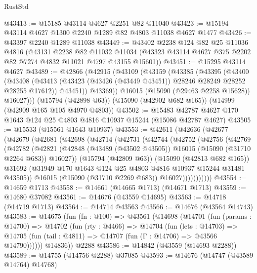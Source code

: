 \begin{lexlean}{RustStd}
\begin{coremodule}
@43413 := @15185 @43114 @4627 @2251 @82 @11040
@43423 := @15194 @43114 @4627 @1300 @2240 @1289 @82 @4803 @11038 @4627 @1477
@43426 := @43397 @2240 @1289 @11038
@43449 := @43402
    @2238
    @124
    @82
    @25
    @11036
    @4816
    (@43131
      @2238
      @82
      @11032
      @11034
      (@43323 @43114 @4627 @375 @2202 @82 @7274 @4832 @11021 @4797 @43155 @15601))
@43451 := @15295 @43114 @4627
@43489 := @42866
    (@42915
      (@43109
        (@43159
          (@43385
            (@43395
              (@43400
                (@43408
                  (@43413 (@43423 (@43426 (@43449 @43451)) @28246 @28249 @28252 @28255 @17612))
                  @43451))
              @43369))
          @16015
          (@15090 (@29463 @2258 @15628))
          @16027)))
    (@15794 (@42898 @63))
    (@15090 (@42902 @682 @165))
    (@14999 (@42909 @165 @105 @4970 @4803))
@43502 := @15483 @42787 @4627 @170 @1643 @124 @25 @4803 @4816 @10937 @15244 (@15086 @42787 @4627)
@43505 := @15533 (@15561 @1643 @10937)
@43553 := @42611
    (@42636
      (@42677
        (@42679
          (@42681
            (@42698
              (@42714
                (@42731
                  (@42744
                    (@42752
                      (@42756
                        (@42769
                          (@42782
                            (@42821
                              (@42848
                                (@43489 (@43502 @43505))
                                @16015
                                (@15090 (@31710 @2264 @683))
                                @16027))
                            (@15794 (@42809 @63))
                            (@15090 (@42813 @682 @165))
                            @31692
                            (@31949 @170 @1643 @124 @25 @4803 @4816 @10937 @15244 @31481 @43505))
                          @16015
                          (@15090 (@31710 @2269 @683))
                          @16027)))))))))))
@43554 := @14659 @1713
@43558 := @14661 (@14665 @1713) (@14671 @1713)
@43559 := @14680 @37082
@43561 := @14676 (@43559 @14695)
@43563 := @14718 (@14719 @1713)
@43564 := @14714 @43563
@43566 := @14676 (@43564 @14743)
@43583 := @14675
    (fun (fn : @100) =>
    @43561
      (@14698
        (@14701
          (fun (params : @14700) =>
          @14702
            (fun (rty : @4466) =>
            @14704
              (fun (lets : @14703) =>
              @14705 (fun (tail : @4811) => @14707 (fun (Γ : @14706) => @43566 @14790))))))
        @14836))
    @2288
@43586 := @14842 (@43559 (@14693 @2288))
@43589 := @14755 (@14756 @2288) @37085
@43593 := @14676 (@14747 (@43589 @14764) @14768)

\end{coremodule}
\end{lexlean}
